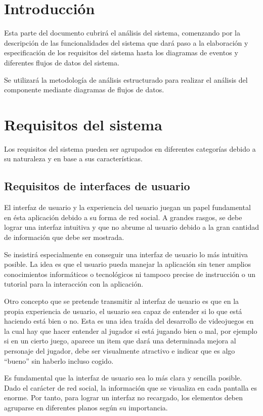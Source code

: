 \section{Introducción}
Esta parte del documento cubrirá el análisis del sistema, comenzando por la descripción de las funcionalidades del sistema que dará paso a la elaboración y especificación de los requisitos del sistema hasta los diagramas de eventos y diferentes flujos de datos del sistema.

Se utilizará la metodología de análisis estructurado para realizar el análisis del componente mediante diagramas de flujos de datos.


\section{Requisitos del sistema}

Los requisitos del sistema pueden ser agrupados en diferentes categorías debido a su naturaleza y en base a sus características.

\subsection{Requisitos de interfaces de usuario}
El interfaz de usuario y la experiencia del usuario juegan un papel fundamental en ésta aplicación debido a su forma de red social. A grandes rasgos, se debe lograr una interfaz intuitiva y que no abrume al usuario debido a la gran cantidad de información que debe ser mostrada.
 
Se insistirá especialmente en conseguir una interfaz de usuario lo más intuitiva posible.
La idea es que el usuario pueda manejar la aplicación sin tener amplios conocimientos informáticos o tecnológicos ni tampoco precise de instrucción o un tutorial para la interacción con la aplicación.
 
Otro concepto que se pretende transmitir al interfaz de usuario es que en la propia experiencia de usuario, el usuario sea capaz de entender si lo que está haciendo está bien o no. Esta es una idea traída del desarrollo de videojuegos en la cual hay que hacer entender al jugador si está jugando bien o mal, por ejemplo si en un cierto juego, aparece un item que dará una determinada mejora al personaje del jugador, debe ser visualmente atractivo e indicar que es algo ``bueno'' sin haberlo incluso cogido.

Es fundamental que la interfaz de usuario sea lo más clara y sencilla posible. Dado el carácter de red social, la información que se visualiza en cada pantalla es enorme. Por tanto, para lograr un interfaz no recargado, los elementos deben agruparse en diferentes planos según su importancia.

